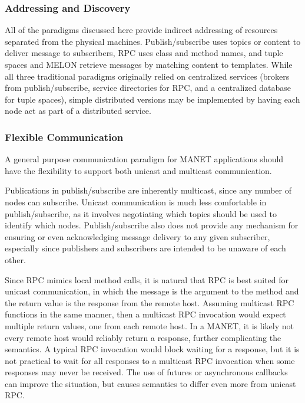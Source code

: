 \subsubsection{Addressing and Discovery}

All of the paradigms discussed here provide indirect addressing of resources separated from the physical machines. Publish/subscribe uses topics or content to deliver message to subscribers, RPC uses class and method names, and tuple spaces and MELON retrieve messages by matching content to templates. While all three traditional paradigms originally relied on centralized services (brokers from publish/subscribe, service directories for RPC, and a centralized database for tuple spaces), simple distributed versions may be implemented by having each node act as part of a distributed service.

\subsubsection{Flexible Communication}

A general purpose communication paradigm for MANET applications should have the flexibility to support both unicast and multicast communication.

Publications in publish/subscribe are inherently multicast, since any number of nodes can subscribe. Unicast communication is much less comfortable in publish/subscribe, as it involves negotiating which topics should be used to identify which nodes. Publish/subscribe also does not provide any mechanism for ensuring or even acknowledging message delivery to any given subscriber, especially since publishers and subscribers are intended to be unaware of each other.

Since RPC mimics local method calls, it is natural that RPC is best suited for unicast communication, in which the message is the argument to the method and the return value is the response from the remote host. Assuming multicast RPC functions in the same manner, then a multicast RPC invocation would expect multiple return values, one from each remote host. In a MANET, it is likely not every remote host would reliably return a response, further complicating the semantics. A typical RPC invocation would block waiting for a response, but it is not practical to wait for all responses to a multicast RPC invocation when some responses may never be received. The use of futures or asynchronous callbacks can improve the situation, but causes semantics to differ even more from unicast RPC.


